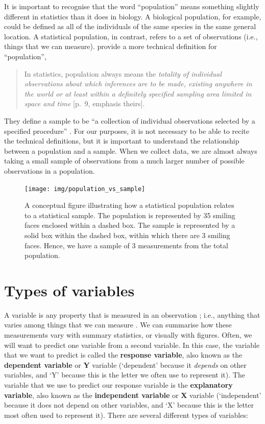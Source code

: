 \documentclass[
]{scrbook}
\begin{document}
It is important to recognise that the word ``population'' means something slightly different in statistics than it does in biology.
A biological population, for example, could be defined as all of the individuals of the same species in the same general location.
A statistical population, in contrast, refers to a set of observations (i.e., things that we can measure).
\citet{Sokal1995} provide a more technical definition for ``population'',

\begin{quote}
In statistics, population always means the \emph{totality of individual observations about which inferences are to be made, existing anywhere in the world or at least within a definitely specified sampling area limited in space and time} {[}p.~9, emphasis theirs{]}.
\end{quote}

They define a sample to be ``a collection of individual observations selected by a specified procedure'' \citep{Sokal1995}.
For our purposes, it is not necessary to be able to recite the technical definitions, but it is important to understand the relationship between a population and a sample.
When we collect data, we are almost always taking a small sample of observations from a much larger number of possible observations in a population.

\begin{figure}
\texttt{[image: img/population\_vs\_sample]} \caption{A conceptual figure illustrating how a statistical population relates to a statistical sample. The population is represented by 35 smiling faces enclosed within a dashed box. The sample is represented by a solid box within the dashed box, within which there are 3 smiling faces. Hence, we have a sample of 3 measurements from the total population.}\label{fig:unnamed-chunk-20}
\end{figure}

\hypertarget{Chapter_5}{%
\chapter{Types of variables}\label{Chapter_5}}

A variable is any property that is measured in an observation \citep{Sokal1995}; i.e., anything that varies among things that we can measure \citep{Dytham2011}.
We can summarise how these measurements vary with summary statistics, or visually with figures.
Often, we will want to predict one variable from a second variable.
In this case, the variable that we want to predict is called the \textbf{response variable}, also known as the \textbf{dependent variable} or \textbf{Y} variable (`dependent' because it \emph{depends} on other variables, and `Y' because this is the letter we often use to represent it).
The variable that we use to predict our response variable is the \textbf{explanatory variable}, also known as the \textbf{independent variable} or \textbf{X} variable (`independent' because it does not depend on other variables, and `X' because this is the letter most often used to represent it).
There are several different types of variables:
\end{document}
